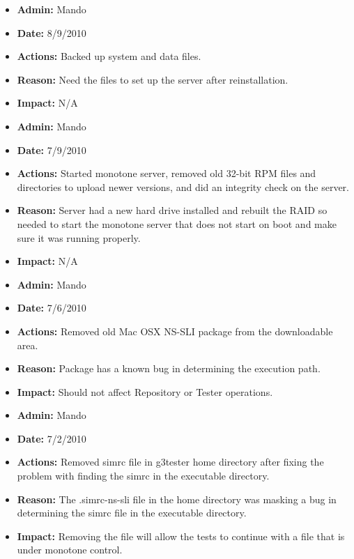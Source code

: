 \documentclass[12pt]{article}
\begin{document}
\begin{itemize}
\item[] {\bf Admin:} Mando
\item[] {\bf Date:} 8/9/2010 
\item[] {\bf Actions:} Backed up system and data files.
\item[] {\bf Reason:} Need the files to set up the server after reinstallation.
\item[] {\bf Impact:} N/A
\end{itemize}

\begin{itemize}
\item[] {\bf Admin:} Mando
\item[] {\bf Date:} 7/9/2010 
\item[] {\bf Actions:} Started monotone server, removed old 32-bit RPM files and directories to upload newer versions, and did an integrity check on the server.
\item[] {\bf Reason:} Server had a new hard drive installed and rebuilt the RAID so needed to start the monotone server that does not start on boot and make sure it was running properly. 
\item[] {\bf Impact:} N/A
\end{itemize}

\begin{itemize}
\item[] {\bf Admin:} Mando
\item[] {\bf Date:} 7/6/2010
\item[] {\bf Actions:} Removed old Mac OSX NS-SLI package from the downloadable area.
\item[] {\bf Reason:}   Package has a known bug in determining the execution path. 
\item[] {\bf Impact:} Should not affect Repository or Tester operations.
\end{itemize}

\begin{itemize}
\item[] {\bf Admin:} Mando
\item[] {\bf Date:} 7/2/2010 
\item[] {\bf Actions:} Removed simrc file in g3tester home directory after fixing the problem with finding the simrc in the executable directory.
\item[] {\bf Reason:} The .simrc-ns-sli file in the home directory was masking a bug in determining the simrc file in the executable directory. 
\item[] {\bf Impact:} Removing the file will allow the tests to continue with a file that is under monotone control.
\end{itemize}
\end{document}
